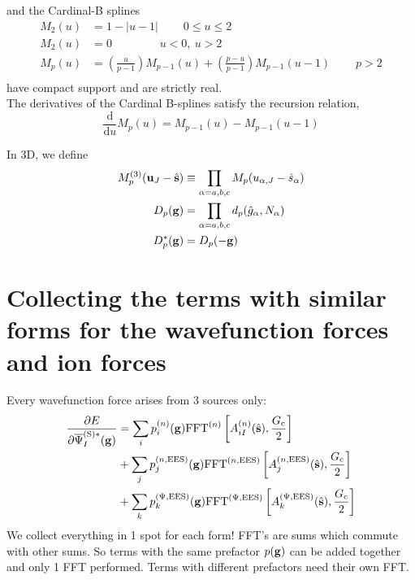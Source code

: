 \documentclass[paper=a4, fontsize=11pt]{article} %
\numberwithin{equation}{section} %
\numberwithin{figure}{section} %
\numberwithin{table}{section} %
\newcommand{\p}{\partial}
\newcommand{\bu}{{\bf{u}}}
\newcommand{\bs}{{\bf{s}}}
\newcommand{\bg}{{\bf{g}}}
\newcommand{\hs}{{\hat{\bf{s}}}}
\newcommand{\rS}{{\mathrm{S}}}
\newcommand{\rEES}{{\mathrm{EES}}}
\newcommand{\rd}{{\mathrm{d}}}
\newcommand{\pabc}{\prod_{\alpha=a,b,c}}
\newcommand{\psigsc}{{\overline \Psi_I^{(\rS)*}(\bg)}}
\newcommand{\hGc}{{\frac{G_{\mathrm{c}}}{2}}}
\begin{document}
and the Cardinal-B splines
\begin{equation}
\begin{split}
M_2(u) &= 1-|u-1|\ \ \ \ \ \ \ \ \ \ 0 \leq u \leq 2\\
M_2(u) &= 0\ \ \ \ \ \ \ \ \ \ \ \ \ \ \ \ \ \ \ u<0,\ u > 2\\
M_p(u) &= \left(\frac{u}{p-1}\right)M_{p-1}(u) + \left(\frac{p-u}{p-1}\right)M_{p-1}(u-1)\ \ \ \ \ \ \ \ \ \ p>2\\
\end{split}
\end{equation}
have compact support and are strictly real.\\

The derivatives of the Cardinal B-splines satisfy the recursion relation, 
\begin{equation}
\frac{\rd}{\rd u}M_p(u) = M_{p-1}(u) - M_{p-1}(u-1)
\end{equation}

In 3D, we define
\begin{equation}
\begin{split}
M_p^{(3)}(\bu_{J}-\hat \bs) &\equiv \pabc M_p(u_{\alpha,J}-\hat s_{\alpha}) \\
D_p(\bg) &= \pabc d_p(\hat{g}_{\alpha},N_\alpha) \\
D_p^*(\bg) &= D_p(-\bg) \\
\end{split}
\end{equation}

\newpage
\section{Collecting the terms with similar forms for the wavefunction forces and ion forces}\label{App:collectA}
Every wavefunction force arises from 3 sources only:
\begin{equation}
\begin{split}
\frac{\p E}{\p \psigsc} &= \sum_i p_i^{(n)}(\bg) \mathrm{FFT}^{(n)} \left[A_{iI}^{(n)}(\hs),\hGc\right]\\
&+ \sum_j p_j^{(n,\rEES)}(\bg) \mathrm{FFT}^{(n,\rEES)} \left[A_j^{(n,\rEES)}(\hs),\hGc\right]\\
&+ \sum_k p_k^{(\Psi,\rEES)}(\bg) \mathrm{FFT}^{(\Psi,\rEES)} \left[A_k^{(\Psi,\rEES)}(\hs),\hGc\right]\\
\end{split}
\end{equation}
We collect everything in 1 spot for each form! FFT's are sums which commute with other sums. So terms with the same prefactor $p(\bg)$ can be added together and only 1 FFT performed. Terms with different prefactors need their own FFT.\\
\end{document}

